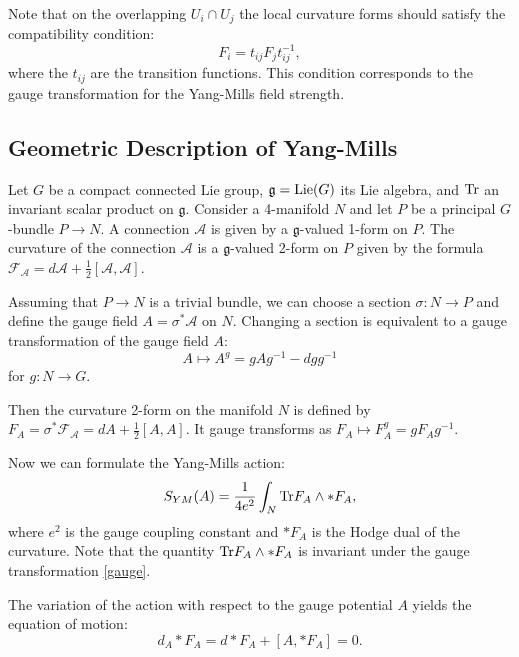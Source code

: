 \documentclass[11pt]{report}
\theoremstyle{plain}
\theoremstyle{definition}
\theoremstyle{remark}
\theoremstyle{remark}
\numberwithin{equation}{section}
\begin{document}
Note that on the overlapping $U_i\cap U_j$ the local curvature forms should satisfy the compatibility condition:
$$F_i = t_{ij}F_jt_{ij}^{-1},$$
where the $t_{ij}$ are the transition functions. This condition corresponds to the  gauge transformation for the Yang-Mills field strength. 


\subsection{Geometric Description of Yang-Mills}\label{GYM}

Let $G$ be a compact connected Lie group, $\mathfrak{g}={\rm Lie}(G)$ its Lie algebra, and  ${\rm Tr}$ an invariant scalar product on $\mathfrak{g}$. Consider a 4-manifold $N$ and let $P$ be a principal $G$-bundle $P \to N$.  A connection $\mathcal{A}$ is given by a $\mathfrak{g}$-valued 1-form on $P$. The curvature of the connection $\mathcal{A}$ is a $\mathfrak{g}$-valued 2-form on $P$ given by the formula $\mathcal{F}_{\mathcal{A}} = d\mathcal{A} +\frac{1}{2}[\mathcal{A}, \mathcal{A}]$.



Assuming that $P\to N$ is a trivial bundle, we can choose a section
$\sigma: N \to P$ and define the gauge field $A= \sigma^*\mathcal{A}$ on $N$. Changing a section is equivalent to a gauge transformation of
the gauge field $A$: 
%
\begin{equation}\label{gauge}
A \mapsto A^g= gAg^{-1} - dg g^{-1}
\end{equation}
for $g: N \to G$.

Then the curvature 2-form on the manifold $N$ is defined by $F_A= \sigma^*\mathcal{F}_{\mathcal{A}} =dA + \frac{1}{2} [A,A]$. It gauge transforms as $F_A \mapsto F_A^g= gF_Ag^{-1}$.


Now we can formulate the Yang-Mills action:
\begin{equation}
S_{YM}(A)  = \frac{1}{4 e^2} \int_N {\rm Tr} F_A \wedge \ast F_A,
\end{equation}
where $e^2$ is the gauge coupling constant and $\ast F_A$ is the Hodge dual of the curvature. Note that the quantity ${\rm Tr} F_A \wedge \ast F_A$ is invariant under the gauge transformation \eqref{gauge}.

 The variation of the action with respect to the gauge potential $A$ yields the equation of motion: 
 \begin{equation}
 d_A\ast F_A = d\ast F_A + [A,\ast F_A] = 0.
 \end{equation}
 
\end{document}
